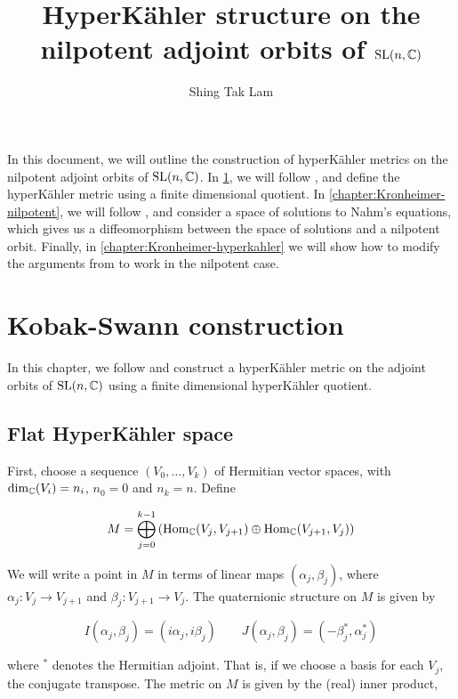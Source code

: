 \documentclass{report}
\title{HyperK\"ahler structure on the nilpotent adjoint orbits of \(\operatorname{SL}(n, \mathbb{C})\)}
\author{Shing Tak Lam}
\begin{document}
\maketitle

In this document, we will outline the construction of hyperK\"ahler metrics on the nilpotent adjoint orbits of \(\operatorname{SL}(n, \mathbb{C})\). In \cref{chapter:Kobak-Swann}, we will follow \cite{kobak_classical_1996}, and define the hyperK\"ahler metric using a finite dimensional quotient. In \cref{chapter:Kronheimer-nilpotent}, we will follow \cite{kronheimer_instantons_1990}, and consider a space of solutions to Nahm's equations, which gives us a diffeomorphism between the space of solutions and a nilpotent orbit. Finally, in \cref{chapter:Kronheimer-hyperkahler} we will show how to modify the arguments from \cite{kronheimer_hyper-kahlerian_1990} to work in the nilpotent case.

\tableofcontents

\chapter{Kobak-Swann construction}

\label{chapter:Kobak-Swann}

In this chapter, we follow \cite{kobak_classical_1996} and construct a hyperK\"ahler metric on the adjoint orbits of \(\operatorname{SL}(n, \mathbb{C})\) using a finite dimensional hyperK\"ahler quotient.

\section{Flat HyperK\"ahler space}

First, choose a sequence \((V_0, \dots, V_k)\) of Hermitian vector spaces, with \(\dim_{\mathbb{C}}(V_i) = n_i\), \(n_0 = 0\) and \(n_k = n\). Define

\[M = \bigoplus_{j=0}^{k-1}\left(\operatorname{Hom}_{\mathbb{C}}(V_j, V_{j+1}) \oplus \operatorname{Hom}_{\mathbb{C}}(V_{j+1}, V_j)\right)\]

We will write a point in \(M\) in terms of linear maps \((\alpha_j, \beta_j)\), where \(\alpha_j : V_j \to V_{j+1}\) and \(\beta_j : V_{j+1} \to V_j\). The quaternionic structure on \(M\) is given by

\[I(\alpha_j, \beta_j) = (i\alpha_j, i\beta_j) \qquad J(\alpha_j, \beta_j) = (-\beta_j^*, \alpha_j^*)\]

where \(^*\) denotes the Hermitian adjoint. That is, if we choose a basis for each \(V_j\), the conjugate transpose. The metric on \(M\) is given by the (real) inner product,
\end{document}
